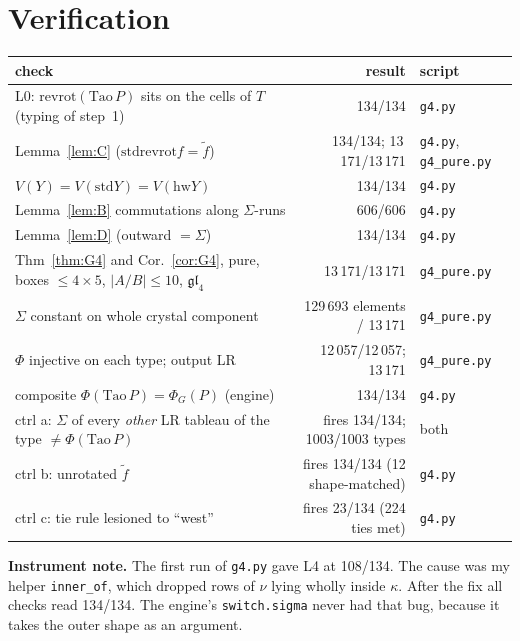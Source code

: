 \documentclass[11pt]{article}
\theoremstyle{definition}
\newcommand{\std}{\mathrm{std}}
\newcommand{\rr}{\mathrm{revrot}}
\newcommand{\hw}{\mathrm{hw}}
\begin{document}
\section{Verification}
\begin{center}\begin{tabular}{lrl}\toprule
check & result & script\\\midrule
L0: $\rr(\mathrm{Tao}\,P)$ sits on the cells of $T$ (typing of step~1) & 134/134 & \texttt{g4.py}\\
Lemma~\ref{lem:C} ($\std\rr f=\tilde f$) & 134/134; 13\,171/13\,171 & \texttt{g4.py}, \texttt{g4\_pure.py}\\
$V(Y)=V(\std Y)=V(\hw Y)$ & 134/134 & \texttt{g4.py}\\
Lemma~\ref{lem:B} commutations along $\Sigma$-runs & 606/606 & \texttt{g4.py}\\
Lemma~\ref{lem:D} (outward $=\Sigma$) & 134/134 & \texttt{g4.py}\\
Thm~\ref{thm:G4} and Cor.~\ref{cor:G4}, pure, boxes $\le4\times5$, $|A/B|\le10$, $\mathfrak{gl}_4$ & 13\,171/13\,171 & \texttt{g4\_pure.py}\\
$\Sigma$ constant on whole crystal component & 129\,693 elements / 13\,171 & \texttt{g4\_pure.py}\\
$\Phi$ injective on each type; output LR & 12\,057/12\,057; 13\,171 & \texttt{g4\_pure.py}\\
composite $\Phi(\mathrm{Tao}\,P)=\Phi_G(P)$ (engine) & 134/134 & \texttt{g4.py}\\\midrule
ctrl a: $\Sigma$ of every \emph{other} LR tableau of the type $\ne\Phi(\mathrm{Tao}\,P)$ & fires 134/134; 1003/1003 types & both\\
ctrl b: unrotated $\tilde f$ & fires 134/134 (12 shape-matched) & \texttt{g4.py}\\
ctrl c: tie rule lesioned to ``west'' & fires 23/134 (224 ties met) & \texttt{g4.py}\\\bottomrule
\end{tabular}\end{center}
\textbf{Instrument note.} The first run of \texttt{g4.py} gave L4 at 108/134. The cause was my helper \texttt{inner\_of}, which
dropped rows of $\nu$ lying wholly inside $\kappa$. After the fix all checks read 134/134. The engine's \texttt{switch.sigma} never
had that bug, because it takes the outer shape as an argument.
\end{document}
